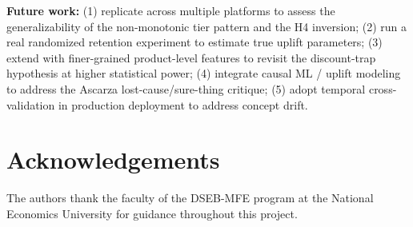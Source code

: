 \documentclass[conference]{IEEEtran}
\begin{document}
\textbf{Future work:} (1) replicate across multiple platforms to assess the generalizability of the non-monotonic tier pattern and the H4 inversion; (2) run a real randomized retention experiment to estimate true uplift parameters; (3) extend with finer-grained product-level features to revisit the discount-trap hypothesis at higher statistical power; (4) integrate causal ML / uplift modeling to address the Ascarza lost-cause/sure-thing critique; (5) adopt temporal cross-validation in production deployment to address concept drift.

\section*{Acknowledgements}
The authors thank the faculty of the DSEB-MFE program at the National Economics University for guidance throughout this project.
\end{document}

